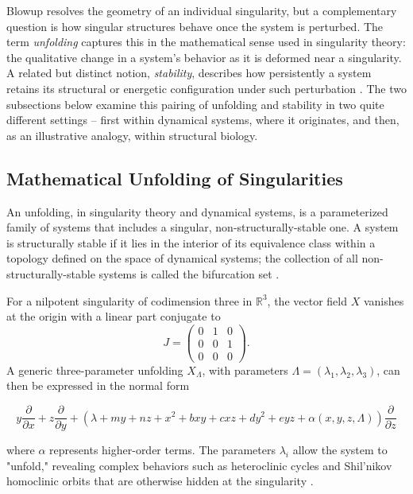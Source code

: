 \documentclass[12pt, a4paper, oneside]{book}
\theoremstyle{plain}
\theoremstyle{definition}
\theoremstyle{remark}
\theoremstyle{definition}
\begin{document}
Blowup resolves the geometry of an individual singularity, but a complementary question is how singular structures behave once the system is perturbed. The term \emph{unfolding} captures this in the mathematical sense used in singularity theory: the qualitative change in a system's behavior as it is deformed near a singularity. A related but distinct notion, \emph{stability}, describes how persistently a system retains its structural or energetic configuration under such perturbation \cite{ibanez2005shil, soncini2007mechanical}. The two subsections below examine this pairing of unfolding and stability in two quite different settings -- first within dynamical systems, where it originates, and then, as an illustrative analogy, within structural biology.

\subsection{Mathematical Unfolding of Singularities}

An unfolding, in singularity theory and dynamical systems, is a parameterized family of systems that includes a singular, non-structurally-stable one. A system is structurally stable if it lies in the interior of its equivalence class within a topology defined on the space of dynamical systems; the collection of all non-structurally-stable systems is called the bifurcation set \cite{ibanez2005shil}.

For a nilpotent singularity of codimension three in $\mathbb{R}^3$, the vector field $X$ vanishes at the origin with a linear part conjugate to
\begin{equation}
    J = \begin{pmatrix} 0 & 1 & 0 \\ 0 & 0 & 1 \\ 0 & 0 & 0 \end{pmatrix}.
\end{equation}
A generic three-parameter unfolding $X_\Lambda$, with parameters $\Lambda = (\lambda_1, \lambda_2, \lambda_3)$, can then be expressed in the normal form

\begin{equation}
    y \frac{\partial}{\partial x} + z \frac{\partial}{\partial y} + (\lambda + my + nz + x^2 + bxy + cxz + dy^2 + eyz + \alpha(x, y, z, \Lambda)) \frac{\partial}{\partial z}
\end{equation}

where $\alpha$ represents higher-order terms. The parameters $\lambda_i$ allow the system to "unfold," revealing complex behaviors such as heteroclinic cycles and Shil'nikov homoclinic orbits that are otherwise hidden at the singularity \cite{ibanez2005shil}.
\end{document}
